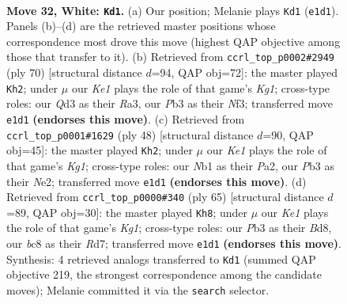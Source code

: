 \documentclass[11pt]{article}
\begin{document}
\clearpage

\begin{figure}[p]\centering
\begin{subfigure}{0.46\textwidth}\centering
\resizebox{\linewidth}{!}{%
\newchessgame
\chessboard[
  setfen={qrb3k1/p2n1r1p/5b2/2p5/Pp1p1P2/1P1Q2N1/R3P3/1NB1K2R w - - 10 32},
  showmover=false,
  pgfstyle=straightmove, color=movearrow, markmove={e1-d1}
]}
\caption{}
\end{subfigure}\hfill
\begin{subfigure}{0.46\textwidth}\centering
\resizebox{\linewidth}{!}{%
\newchessgame
\chessboard[
  setfen={r2b2k1/r5np/2q1ppp1/2Pp4/pR1P2P1/R4NBP/Q4P2/6K1 w - - 6 36},
  showmover=false,
  pgfstyle=straightmove, color=movearrow, markmove={g1-h2}
]}
\caption{}
\end{subfigure}
\\[4pt]
\begin{subfigure}{0.46\textwidth}\centering
\resizebox{\linewidth}{!}{%
\newchessgame
\chessboard[
  setfen={2r3k1/1q1b1pp1/1rnp4/4p2p/1pR1P3/1P4PP/P2QNPB1/3R2K1 w - - 0 25},
  showmover=false,
  pgfstyle=straightmove, color=movearrow, markmove={g1-h2}
]}
\caption{}
\end{subfigure}\hfill
\begin{subfigure}{0.46\textwidth}\centering
\resizebox{\linewidth}{!}{%
\newchessgame
\chessboard[
  setfen={2rb2k1/3r2p1/1np2p2/4p2p/1P2N1qP/2P3P1/Q2B1PK1/1R2R3 b - - 3 33},
  showmover=false,
  pgfstyle=straightmove, color=movearrow, markmove={g8-h8}
]}
\caption{}
\end{subfigure}
\caption{\textbf{Move 32, White: \texttt{Kd1}.} (a) Our position; Melanie plays \texttt{Kd1} (\texttt{e1d1}). Panels (b)--(d) are the retrieved master positions whose correspondence most drove this move (highest QAP objective among those that transfer to it). (b) Retrieved from \texttt{ccrl\_top\_p0002\#2949} (ply 70) [structural distance $d$=94, QAP obj=72]: the master played \texttt{Kh2}; under $\mu$ our \emph{Ke1} plays the role of that game's \emph{Kg1}; cross-type roles: our \emph{Q}d3 as their \emph{R}a3, our \emph{P}b3 as their \emph{N}f3; transferred move \texttt{e1d1} \textbf{(endorses this move)}. (c) Retrieved from \texttt{ccrl\_top\_p0001\#1629} (ply 48) [structural distance $d$=90, QAP obj=45]: the master played \texttt{Kh2}; under $\mu$ our \emph{Ke1} plays the role of that game's \emph{Kg1}; cross-type roles: our \emph{N}b1 as their \emph{P}a2, our \emph{P}b3 as their \emph{N}e2; transferred move \texttt{e1d1} \textbf{(endorses this move)}. (d) Retrieved from \texttt{ccrl\_top\_p0000\#340} (ply 65) [structural distance $d$=89, QAP obj=30]: the master played \texttt{Kh8}; under $\mu$ our \emph{Ke1} plays the role of that game's \emph{Kg1}; cross-type roles: our \emph{P}b3 as their \emph{B}d8, our \emph{b}c8 as their \emph{R}d7; transferred move \texttt{e1d1} \textbf{(endorses this move)}. Synthesis: 4 retrieved analogs transferred to \texttt{Kd1} (summed QAP objective 219, the strongest correspondence among the candidate moves); Melanie committed it via the \texttt{search} selector.}
\label{fig:thought-m62}
\end{figure}
\end{document}
